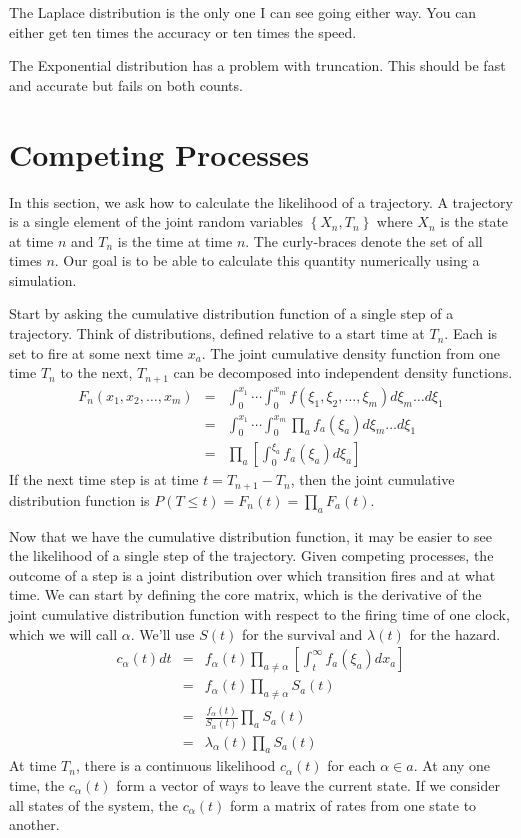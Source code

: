 \documentclass{article}
\begin{document}
The Laplace distribution is the only one I can see going either way. You can either get ten times the accuracy or ten times the speed.

The Exponential distribution has a problem with truncation. This should be fast and accurate but fails on both counts.


\section{Competing Processes}

In this section, we ask how to calculate the likelihood of a trajectory. A trajectory is a single element of the joint random variables $\left\{X_n,T_n\right\}$ where $X_n$ is the state at time $n$ and $T_n$ is the time at time $n$. The curly-braces denote the set of all times $n$. Our goal is to be able to calculate this quantity numerically using a simulation.

Start by asking the cumulative distribution function of a single step of a trajectory. Think of distributions, defined relative to a start time at $T_n$. Each is set to fire at some next time $x_a$. The joint cumulative density function from one time $T_n$ to the next, $T_{n+1}$ can be decomposed into independent density functions.
\begin{eqnarray}
	F_n(x_1, x_2,\ldots,x_m) &= &\int_0^{x_1}\cdots\int_0^{x_m}f(\xi_1,\xi_2,\ldots,\xi_m)d\xi_m\ldots d\xi_1 \\
	&= &\int_0^{x_1}\cdots\int_0^{x_m}\prod_a f_a(\xi_a)d\xi_m\ldots d\xi_1\ \\
	&= &\prod_a \left[\int_0^{\xi_a}f_a(\xi_a)d\xi_a\right]
\end{eqnarray}
If the next time step is at time $t=T_{n+1}-T_n$, then the joint cumulative distribution function is $P(T\le t)=F_n(t)=\prod_a F_a(t).$

Now that we have the cumulative distribution function, it may be easier to see the likelihood of a single step of the trajectory. Given competing processes, the outcome of a step is a joint distribution over which transition fires and at what time. We can start by defining the core matrix, which is the derivative of the joint cumulative distribution function with respect to the firing time of one clock, which we will call $\alpha$.
We'll use $S(t)$ for the survival and $\lambda(t)$ for the hazard.
\begin{eqnarray}
	c_{\alpha}(t)dt &=& f_{\alpha}(t)\prod_{a\ne\alpha}\left[\int_{t}^\infty f_a(\xi_a)dx_a\right] \\
	&=& f_{\alpha}(t)\prod_{a\ne\alpha}S_a(t) \\
	&=& \frac{f_{\alpha}(t)}{S_\alpha(t)}\prod_{a}S_a(t) \\
	&=& \lambda_{\alpha}(t)\prod_{a}S_a(t)\label{eqn:basic-likelihood}
\end{eqnarray}
At time $T_n$, there is a continuous likelihood $c_\alpha(t)$ for each $\alpha\in a$. At any one time, the $c_\alpha(t)$ form a vector of ways to leave the current state. If we consider all states of the system, the $c_\alpha(t)$ form a matrix of rates from one state to another.
\end{document}

